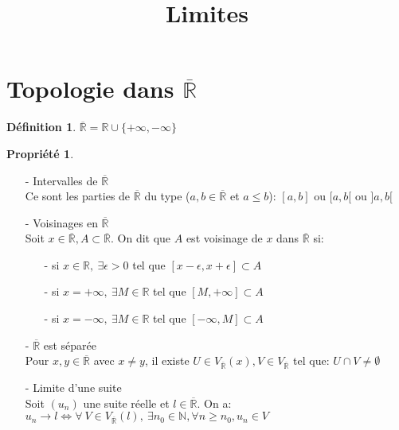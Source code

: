 \documentclass[fleqn]{article}
\title{Limites}
\date{}
\theoremstyle{definition} \newtheorem*{defi}{D\'efinition}
\theoremstyle{definition} \newtheorem*{theo}{Th\'eor\`eme}
\theoremstyle{definition} \newtheorem*{prop}{Propri\'et\'e}
\theoremstyle{remark} \newtheorem*{rqs}{Remarques}
\begin{document}
\maketitle

\section{Topologie dans $\overline{\mathbb{R}}$}
\begin{defi}
	$\overline{\mathbb{R}} = \mathbb{R} \cup \{ +\infty, -\infty\}$
\end{defi}

\begin{prop} $ $
	\begin{itemize}
		\item [-] Intervalles de $\overline{\mathbb{R}}$ \\
			Ce sont les parties de $\overline{\mathbb{R}}$ du type ($a,b \in \overline{\mathbb{R}}$ et $a \leq b$): $[a,b]$ ou $[a,b[$ ou $]a,b[$
		\item [-] Voisinages en $\overline{\mathbb{R}}$ \\
			Soit $x \in \overline{\mathbb{R}}, A \subset \overline{\mathbb{R}}$. On dit que $A$ est voisinage de $x$ dans
			$\overline{\mathbb{R}}$ si:
				\begin{itemize}
					\item[-] si $x \in \mathbb{R},\ \exists \epsilon > 0$ tel que $[x - \epsilon, x + \epsilon] \subset A$
					\item[-] si $x = +\infty,\ \exists M \in \mathbb{R}$ tel que $[M, +\infty] \subset A$
					\item[-] si $x = - \infty,\ \exists M \in \mathbb{R}$ tel que $[-\infty, M] \subset A$
				\end{itemize}
		\item [-]  $\overline{\mathbb{R}}$ est s\'epar\'ee \\
			Pour $x, y \in \overline{\mathbb{R}}$ avec $x \neq y$, il existe $U \in V_{\overline{\mathbb{R}}}(x), V \in V_{\overline{\mathbb{R}}}$
			tel que: $U \cap V \neq \emptyset$
		\item [-] Limite d'une suite \\
			Soit $(u_n)$ une suite r\'eelle et $l \in \overline{\mathbb{R}}$. On a: \\
			$u_n \rightarrow l \Leftrightarrow \forall\ V \in V_{\overline{\mathbb{R}}}(l),\ \exists n_0 \in \mathbb{N}, \forall n
			\geq n_0, u_n \in V$
	\end{itemize}
\end{prop}
\end{document}
